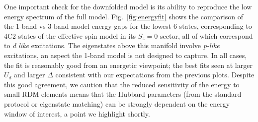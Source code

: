 One important check for the downfolded model is its ability to reproduce the low energy spectrum of 
the full model. Fig.~\ref{fig:energyfit} shows the comparison of the 1-band vs 3-band model energy gaps 
for the lowest 6 states, corresponding to 4C2 states of the effective spin model in its $S_z=0$ sector, 
all of which correspond to \textit{d like} excitations. The eigenstates above this manifold 
involve \textit{p-like} excitations, an aspect the 1-band model is not designed to capture. 
In all cases, the fit is reasonably good from an energetic viewpoint; the best fits seen at larger 
$U_d$ and larger $\Delta$ consistent with our expectations from the previous plots. Despite this good agreement, 
we caution that the reduced sensitivity of the energy to small RDM elements means 
that the Hubbard parameters (from the standard protocol or eigenstate matching) 
can be strongly dependent on the energy window of interest, a point we highlight shortly. 
